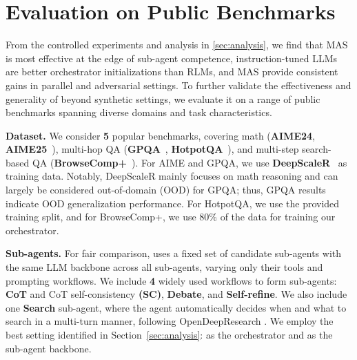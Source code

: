 \section{Evaluation on Public Benchmarks}
\label{sec:experiemnt}




From the controlled experiments and analysis in \cref{sec:analysis}, we find that MAS
is most effective at the edge of sub-agent competence, instruction-tuned LLMs are better orchestrator initializations than RLMs, and MAS provide consistent gains in {parallel and} adversarial settings. To further validate the effectiveness and generality of \ourframework beyond
synthetic settings, we evaluate it on a range of public  benchmarks spanning diverse domains and task characteristics. 

\textbf{Dataset.} We consider \textbf{5} popular benchmarks, covering math (\textbf{AIME24}, \textbf{AIME25}~\citep{aime2024}), multi-hop QA
(\textbf{GPQA}~\cite{rein2023gpqagraduatelevelgoogleproofqa}, \textbf{HotpotQA}~\citep{DBLP:conf/emnlp/Yang0ZBCSM18}), and multi-step search-based QA (\textbf{BrowseComp+}~\cite{chen2025BrowseCompPlus}). For AIME and GPQA, we use \textbf{DeepScaleR}~\cite{deepscaler2025} as training data. Notably, DeepScaleR mainly focuses on math reasoning and can largely be considered out-of-domain (OOD) for GPQA; thus, GPQA results indicate OOD generalization performance. For HotpotQA, we use the provided training split, and for BrowseComp+, {we use 80\% of the data for training our orchestrator.}

\textbf{Sub-agents.} For fair comparison, \ourframework uses a fixed set of candidate sub-agents with the same LLM backbone across all sub-agents, varying only their tools and prompting workflows. 
We include \textbf{4} widely used workflows {to form sub-agents}: \textbf{CoT} and CoT self-consistency \textbf{(SC)}, \textbf{Debate}, and \textbf{Self-refine}. We also include one \textbf{Search} sub-agent, where the agent automatically decides when and what to search in a multi-turn manner, following OpenDeepResearch \cite{langchain_open_deep_research}. We employ the best setting identified in Section~\ref{sec:analysis}: \qwen as the orchestrator and \ossonetwentylow as the sub-agent backbone.


